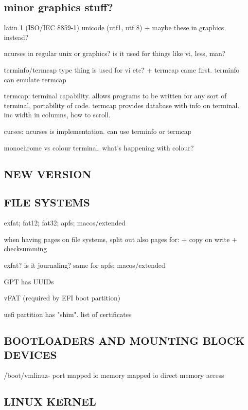 \subsection{minor graphics stuff?}

latin 1 (ISO/IEC 8859-1)
unicode (utf1, utf 8)
+ maybe these in graphics instead?

ncurses in regular unix or graphics? is it used for things like vi, less, man?

terminfo/termcap type thing is used for vi etc?
+ termcap came first. terminfo can emulate termcap

termcap: terminal capability. allows programs to be written for any sort of terminal, portability of code.
termcap provides database with info on terminal. inc width in columns, how to scroll.



curses: ncurses is implementation. can use terminfo or termcap

monochrome vs colour terminal. what's happening with colour?


\subsection{NEW VERSION}

\subsection{FILE SYSTEMS}

exfat; fat12; fat32; apfs; macos/extended

when having pages on file systems, split out also pages for:
+ copy on write
+ checksumming

exfat? is it journaling?
same for apfs; macos/extended

GPT has UUIDs

vFAT (required by EFI boot partition)

uefi partition has "shim". list of certificates

\subsection{BOOTLOADERS AND MOUNTING BLOCK DEVICES}

/boot/vmlinuz-%
port mapped io
memory mapped io
direct memory access

\subsection{LINUX KERNEL}

